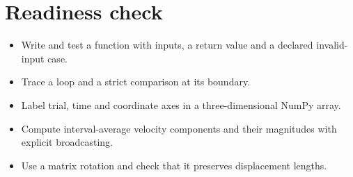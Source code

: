\documentclass[11pt,letterpaper]{article}
\theoremstyle{definition}\newtheorem{definition}{Definition}\newtheorem{example}{Example}
\numberwithin{equation}{section}
\begin{document}
\section*{Readiness check}
\begin{itemize}
\item Write and test a function with inputs, a return value and a declared invalid-input case.
\item Trace a loop and a strict comparison at its boundary.
\item Label trial, time and coordinate axes in a three-dimensional NumPy array.
\item Compute interval-average velocity components and their magnitudes with explicit broadcasting.
\item Use a matrix rotation and check that it preserves displacement lengths.
\end{itemize}
\end{document}
